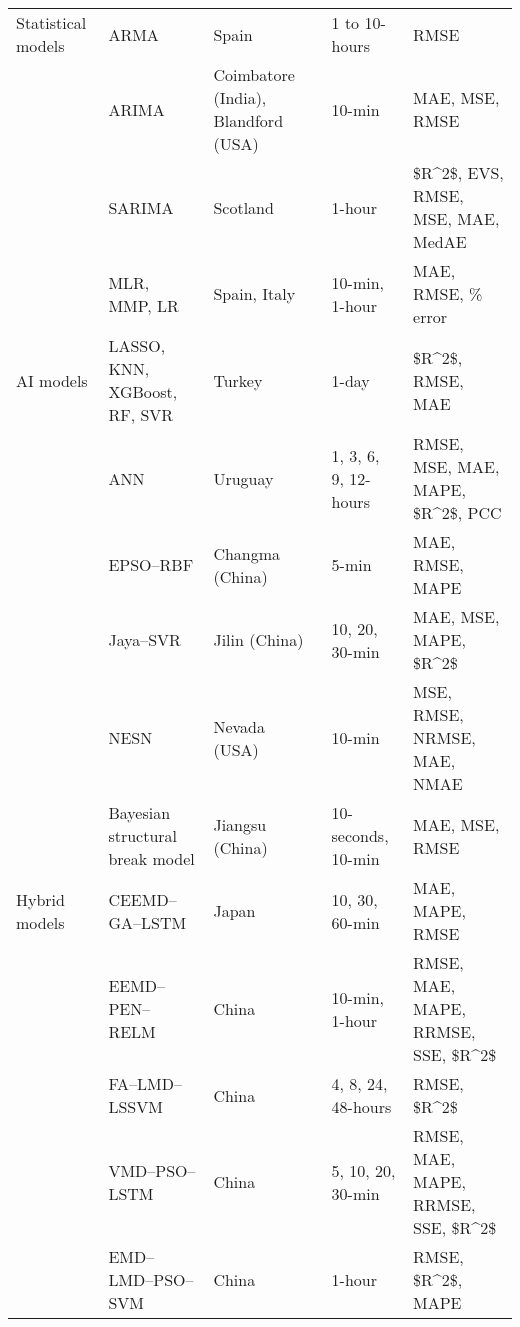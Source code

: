 \begin{scriptsize}
\begin{center}
\begin{longtable}{p{1.5cm}p{5cm}p{3cm}p{2cm}p{2cm}}
Statistical models & \ac{ARMA} \cite{torres2005Forecast} & Spain & 1 to 10-hours & \ac{RMSE} \\
 & \ac{ARIMA} \cite{sandhu2019Comparative} & Coimbatore (India), Blandford (\ac{USA}) & 10-min & \ac{MAE}, \ac{MSE}, \ac{RMSE} \\
 & \ac{SARIMA} \cite{liu2020Shortterm} & Scotland & 1-hour & \ac{$R^2$}, \ac{EVS}, \ac{RMSE}, \ac{MSE}, \ac{MAE}, \ac{MedAE} \\
 & \ac{MLR}, \ac{MMP}, \ac{LR} \cite{casella2019Wind} & Spain, Italy & 10-min, 1-hour & \ac{MAE}, \ac{RMSE}, \% error \\ \hline
\ac{AI} models & \ac{LASSO}, \ac{KNN}, \ac{XGBoost}, \ac{RF}, \ac{SVR} \cite{demolli2019Wind} & Turkey & 1-day & \ac{$R^2$}, \ac{RMSE}, \ac{MAE} \\
 & \ac{ANN} \cite{zucatelli2019Shortterm} & Uruguay & 1, 3, 6, 9, 12-hours & \ac{RMSE}, \ac{MSE}, \ac{MAE}, \ac{MAPE}, \ac{$R^2$}, \ac{PCC} \\
 & \ac{EPSO}--\ac{RBF} \cite{zhang2020Shortterm} & Changma (China) & 5-min & \ac{MAE}, \ac{RMSE}, \ac{MAPE} \\
 & Jaya--\ac{SVR} \cite{liu2020Shortterm} & Jilin (China) & 10, 20, 30-min & \ac{MAE}, \ac{MSE}, \ac{MAPE}, \ac{$R^2$} \\
 & \ac{NESN} \cite{chitsazan2019Wind} & Nevada (\ac{USA}) & 10-min & \ac{MSE}, \ac{RMSE}, \ac{NRMSE}, \ac{MAE}, \ac{NMAE} \\
 & Bayesian structural break model \cite{jiang2013Very} & Jiangsu (China) & 10-seconds, 10-min & \ac{MAE}, \ac{MSE}, \ac{RMSE} \\ \hline
Hybrid models & \ac{CEEMD}--\ac{GA}--\ac{LSTM} \cite{liu2021Hybrid} & Japan & 10, 30, 60-min & \ac{MAE}, \ac{MAPE}, \ac{RMSE} \\
 & \ac{EEMD}--\ac{PEN}--\ac{RELM} \cite{tian2020Prediction} & China & 10-min, 1-hour & \ac{RMSE}, \ac{MAE}, \ac{MAPE}, \ac{RRMSE}, \ac{SSE}, \ac{$R^2$} \\
 & \ac{FA}--\ac{LMD}--\ac{LSSVM} \cite{tian2020Shortterm} & China & 4, 8, 24, 48-hours & \ac{RMSE}, \ac{$R^2$} \\
 & \ac{VMD}--\ac{PSO}--\ac{LSTM} \cite{tian2021Modes} & China & 5, 10, 20, 30-min & \ac{RMSE}, \ac{MAE}, \ac{MAPE}, \ac{RRMSE}, \ac{SSE}, \ac{$R^2$} \\
 & \ac{EMD}--\ac{LMD}--\ac{PSO}--\ac{SVM} \cite{tian2021Multistep} & China & 1-hour & \ac{RMSE}, \ac{$R^2$}, \ac{MAPE} \\

\end{longtable}
\end{center}
\end{scriptsize}
